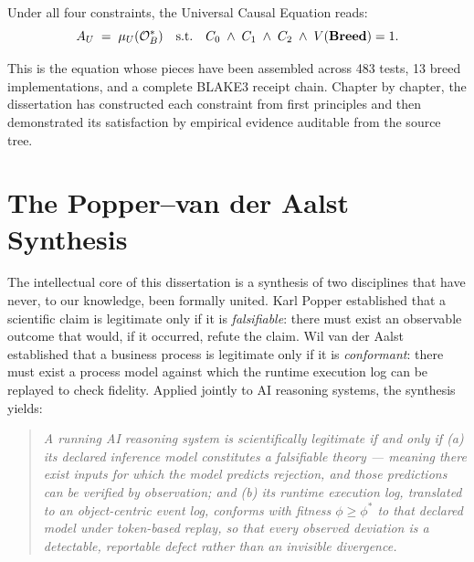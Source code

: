 Under all four constraints, the Universal Causal Equation reads:
\begin{equation}
\label{eq:universal-causal-complete}
  A_U \;=\; \mu_U(\mathcal{O}^*_B)
  \quad \text{s.t.} \quad
  C_0 \;\wedge\; C_1 \;\wedge\; C_2 \;\wedge\; V(\mathbf{Breed}) = 1.
\end{equation}

This is the equation whose pieces have been assembled across 483 tests, 13 breed
implementations, and a complete BLAKE3 receipt chain. Chapter by chapter, the dissertation
has constructed each constraint from first principles and then demonstrated its satisfaction
by empirical evidence auditable from the source tree.

\section{The Popper--van der Aalst Synthesis}
\label{sec:popper-vda-synthesis}

The intellectual core of this dissertation is a synthesis of two disciplines that have
never, to our knowledge, been formally united. Karl Popper established that a scientific
claim is legitimate only if it is \emph{falsifiable}: there must exist an observable
outcome that would, if it occurred, refute the claim. Wil van der Aalst established that a
business process is legitimate only if it is \emph{conformant}: there must exist a process
model against which the runtime execution log can be replayed to check fidelity. Applied
jointly to AI reasoning systems, the synthesis yields:

\begin{quote}
\emph{A running AI reasoning system is scientifically legitimate if and only if (a) its
declared inference model constitutes a falsifiable theory — meaning there exist inputs for
which the model predicts rejection, and those predictions can be verified by observation;
and (b) its runtime execution log, translated to an object-centric event log, conforms
with fitness $\phi \geq \phi^*$ to that declared model under token-based replay, so that
every observed deviation is a detectable, reportable defect rather than an invisible
divergence.}
\end{quote}

